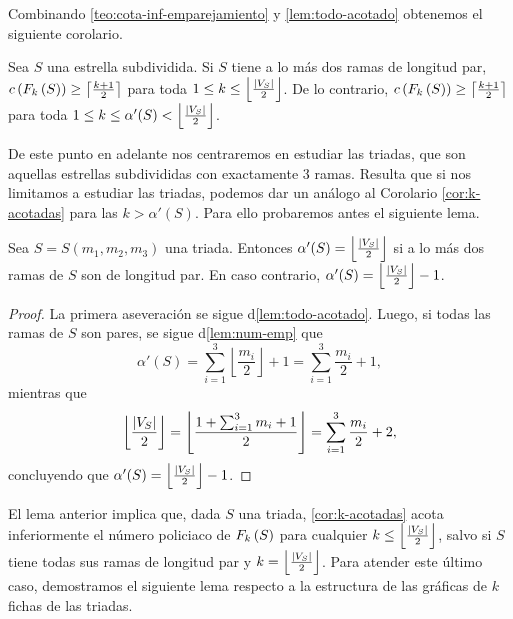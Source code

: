 Combinando \cref{teo:cota-inf-emparejamiento} y \cref{lem:todo-acotado} obtenemos
el siguiente corolario.

\begin{corolario}
\label{cor:k-acotadas}
    Sea $S$ una estrella subdividida. Si $S$ tiene a lo m\'as dos ramas de
    longitud par, $c\left( F_{k}\left( S\right)\right)\geq \left\lceil\frac{k+1}{2}\right\rceil$
    para toda $1\leq k\leq \left\lfloor\frac{\left|V_S\right|}{2}\right\rfloor$. De lo
    contrario, $c\left( F_{k}\left( S\right)\right)\geq \left\lceil\frac{k+1}{2}\right\rceil$ para
    toda $1\leq k\leq \alpha'(S) <
    \left\lfloor\frac{\left|V_S\right|}{2}\right\rfloor$.
\end{corolario}

De este punto en adelante nos centraremos en estudiar las triadas, que son
aquellas estrellas subdivididas con exactamente $3$ ramas. Resulta que si nos
limitamos a estudiar las triadas, podemos dar un an\'alogo al Corolario
\ref{cor:k-acotadas} para las $k>\alpha'(S)$. Para ello probaremos antes el
siguiente lema.

\begin{lema}
\label{lem:emp-triada}
    Sea $S=S(m_1,m_2,m_3)$ una triada. Entonces $\alpha'(S)=\left\lfloor
    \frac{\left|V_S\right|}{2}\right\rfloor$ si a lo m\'as dos ramas de $S$ son de
    longitud par. En caso contrario, $\alpha'(S)=\left\lfloor
    \frac{\left|V_S\right|}{2}\right\rfloor - 1$.
\end{lema}

\begin{proof}
    La primera aseveraci\'on se sigue d\cref{lem:todo-acotado}. Luego, si todas
    las ramas de $S$ son pares, se sigue d\cref{lem:num-emp} que
    \[
        \alpha'(S) = \sum_{i=1}^{3}\left\lfloor\frac{m_i}{2}\right\rfloor + 1 =
        \sum_{i=1}^{3}\frac{m_i}{2} + 1,
    \]
    mientras que
    \[
        \left\lfloor\frac{\left|V_S\right|}{2}\right\rfloor = \left\lfloor\frac{1 + 
        \sum_{i=1}^{3} m_i+1}{2}\right\rfloor = \sum_{i=1}^{3} \frac{m_i}{2} + 2,
    \]
    concluyendo que $\alpha'(S) = \left\lfloor\frac{\left|V_S\right|}{2}\right\rfloor -
    1$.

\end{proof}

El lema anterior implica que, dada $S$ una triada, \cref{cor:k-acotadas} acota
inferiormente el n\'umero policiaco de $F_{k}\left( S\right)$ para cualquier $k\leq
\left\lfloor \frac{\left|V_S\right|}{2}\right\rfloor$, salvo si $S$ tiene todas sus
ramas de longitud par y $k=\left\lfloor\frac{\left|V_S\right|}{2}\right\rfloor$. Para
atender este \'ultimo caso, demostramos el siguiente lema respecto a la
estructura de las gr\'aficas de $k$ fichas de las triadas.

